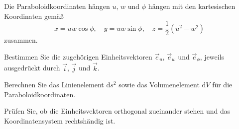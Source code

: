\begin{atiTask}[
  title = Paraboloidkoordinaten
]

Die Paraboloidkoordinaten hängen $u$, $w$ und $\phi$ hängen mit den kartesischen Koordinaten gemäß
\[
x=uw\cos \phi,\quad y=uw\sin \phi,\quad z=\frac{1}{2}(u^2-w^2)
\]
zusammen.
\begin{atiSubtasks}
	\item Bestimmen Sie die zugehörigen Einheitsvektoren $\vec{e}_u$, $\vec{e}_w$ und $\vec{e}_\phi$, jeweils ausgedrückt durch $\vec{i}$, $\vec{j}$ und $\vec{k}$.
	\item Berechnen Sie das Linienelement $\mathrm{d} s^2$ sowie das Volumenelement $\mathrm{d} V$ für die Paraboloidkoordinaten.
	\item Prüfen Sie, ob  die Einheitsvektoren orthogonal zueinander stehen und das Koordinatensystem rechtshändig ist.
\end{atiSubtasks}


\end{atiTask}

\begin{atiSolution}
	
\end{atiSolution}